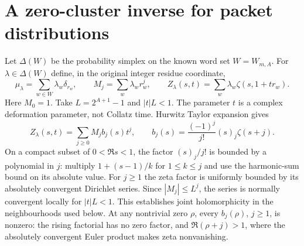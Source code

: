 \documentclass[11pt]{amsart}
\theoremstyle{remark}\newtheorem{remark}[theorem]{Remark}
\begin{document}
\section{A zero-cluster inverse for packet distributions}
Let $\Delta(W)$ be the probability simplex on the known word set $W=W_{m,A}$.
For $\lambda\in\Delta(W)$ define, in the original integer residue coordinate,
\begin{equation}\label{eq:family}
 \mu_\lambda=\sum_{w\in W}\lambda_w\delta_{r_w},\qquad
 M_j=\sum_w\lambda_w r_w^j,\qquad
 Z_\lambda(s,t)=\sum_w\lambda_w\zeta(s,1+tr_w).
\end{equation}
Here $M_0=1$. Take $L=2^{A+1}-1$ and $|t|L<1$. The parameter $t$
is a complex deformation parameter, not Collatz time. Hurwitz Taylor
expansion \cite{dlmf} gives
\begin{equation}\label{eq:hurwitz}
 Z_\lambda(s,t)=\sum_{j\ge0}M_j b_j(s)t^j,\qquad
 b_j(s)=\frac{(-1)^j}{j!}(s)_j\zeta(s+j).
\end{equation}
On a compact subset of $0<\Re s<1$, the factor $(s)_j/j!$ is bounded
by a polynomial in $j$: multiply $1+(s-1)/k$ for $1\le k\le j$ and
use the harmonic-sum bound on its absolute value. For $j\ge1$ the zeta
factor is uniformly bounded by its absolutely convergent Dirichlet series.
Since $|M_j|\le L^j$, the series is normally convergent locally for
$|t|L<1$. This establishes joint holomorphicity in the neighbourhoods used
below. At any nontrivial zero $\rho$, every $b_j(\rho)$, $j\ge1$, is
nonzero: the rising factorial has no zero factor, and $\Re(\rho+j)>1$,
where the absolutely convergent Euler product makes zeta nonvanishing.
\end{document}

